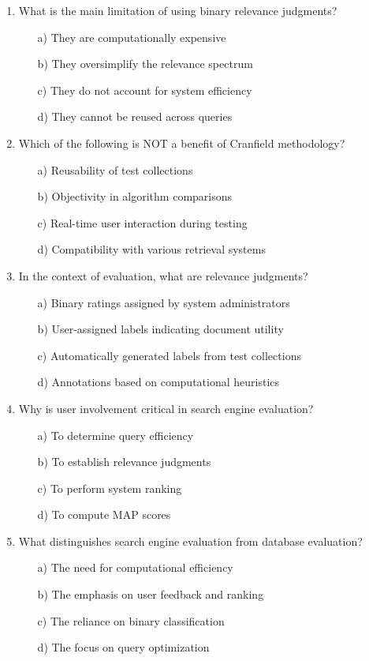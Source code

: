 \documentclass[8pt]{extarticle}
\begin{document}
\begin{multicols}{2}
\begin{enumerate}
\item What is the main limitation of using binary relevance judgments?
\begin{itemize}
\item[a)] They are computationally expensive
\item[b)] They oversimplify the relevance spectrum
\item[c)] They do not account for system efficiency
\item[d)] They cannot be reused across queries
\end{itemize}

\item Which of the following is NOT a benefit of Cranfield methodology?
\begin{itemize}
\item[a)] Reusability of test collections
\item[b)] Objectivity in algorithm comparisons
\item[c)] Real-time user interaction during testing
\item[d)] Compatibility with various retrieval systems
\end{itemize}

\item In the context of evaluation, what are relevance judgments?
\begin{itemize}
\item[a)] Binary ratings assigned by system administrators
\item[b)] User-assigned labels indicating document utility
\item[c)] Automatically generated labels from test collections
\item[d)] Annotations based on computational heuristics
\end{itemize}

\item Why is user involvement critical in search engine evaluation?
\begin{itemize}
\item[a)] To determine query efficiency
\item[b)] To establish relevance judgments
\item[c)] To perform system ranking
\item[d)] To compute MAP scores
\end{itemize}

\item What distinguishes search engine evaluation from database evaluation?
\begin{itemize}
\item[a)] The need for computational efficiency
\item[b)] The emphasis on user feedback and ranking
\item[c)] The reliance on binary classification
\item[d)] The focus on query optimization
\end{itemize}


\end{enumerate}
\end{multicols}
\end{document}
